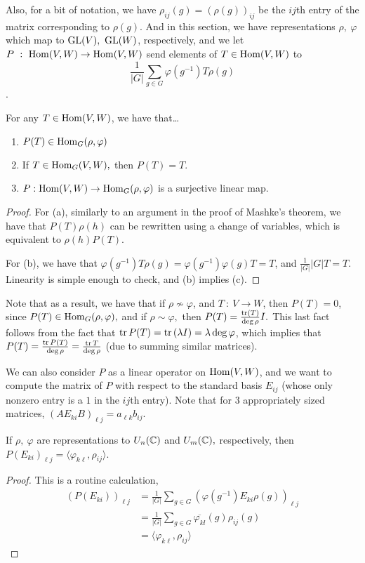 \documentclass{article}
\renewcommand{\phi}{\varphi}
\begin{document}
Also, for a bit of notation, we have $\rho_{ij}(g) = (\rho(g))_{ij}$ be the $ij$th entry of the matrix corresponding to $\rho(g)$. And in this section, we have representations $\rho, \ \phi$ which map to $\operatorname{GL}(V), \ \operatorname{GL}(W)$, respectively, and we let $P \ : \ \operatorname{Hom}(V,W) \to \operatorname{Hom}(V,W)$ send elements of $T \in \operatorname{Hom}(V,W)$ to $$\frac{1}{|G|} \sum_{g \in G} \phi(g^{-1})T\rho(g)$$.

\begin{lemma}
For any $T \in \operatorname{Hom}(V,W)$, we have that\ldots
\begin{enumerate}[label=(\alph*)]
    \item $P(T) \in \Hom_G(\rho,\phi)$
    \item If $T \in \operatorname{Hom}_G(V,W),$ then $P(T)=T$.
    \item $P : \Hom(V,W) \to \Hom_G(\rho,\phi)$ is a surjective linear map.
\end{enumerate}
\end{lemma}

\begin{proof}

For (a), similarly to an argument in the proof of Mashke's theorem, we have that $P(T)\rho(h)$ can be rewritten using a change of variables, which is equivalent to $\rho(h)P(T).$

For (b), we have that $\phi(g^{-1})T\rho(g)=\phi(g^{-1})\phi(g)T=T$, and $\frac{1}{|G|} |G|T = T$. Linearity is simple enough to check, and (b) implies (c).

\end{proof}

Note that as a result, we have that if $\rho \not\sim \phi$, and $T \ : \ V \to W$, then $P(T) = 0$, since $P(T) \in \Hom_G(\rho,\phi),$ and if $\rho \sim \phi,$ then $P(T) = \frac{\operatorname{tr} (T)}{\deg \rho} I.$ This last fact follows from the fact that $\tr P(T)= \tr \left( \lambda I \right) = \lambda \deg \phi$, which implies that $P(T) = \frac{\operatorname{tr} P(T)}{\deg \rho} = \frac{\operatorname{tr} T}{\deg \rho}$ (due to summing similar matrices). 

We can also consider $P$ as a linear operator on $\operatorname{Hom}(V,W)$, and we want to compute the matrix of $P$ with respect to the standard basis $E_{ij}$ (whose only nonzero entry is a $1$ in the $ij$th entry). Note that for 3 appropriately sized matrices, $(AE_{ki}B)_{\ell j} = a_{\ell k}b_{ij}$.

\begin{lemma}

If $\rho, \ \phi$ are representations to $U_n(\mathbb C)$ and $U_m(\mathbb C),$ respectively, then $P(E_{ki})_{\ell j} = \langle \phi_{k\ell}, \rho_{ij} \rangle$.

\end{lemma}
\begin{proof}
This is a routine calculation,
\begin{align*}
    (P(E_{ki}))_{\ell j} &= \frac{1}{|G|} \sum_{g \in G} (\phi(g^{-1})E_{ki}\rho(g))_{\ell j} \\
    &= \frac{1}{|G|} \sum_{g \in G} \overline{\phi_{kl}}(g)\rho_{ij}(g) \\
    &= \langle \phi_{k\ell}, \rho_{ij}\rangle
\end{align*}
\end{proof}
\end{document}
